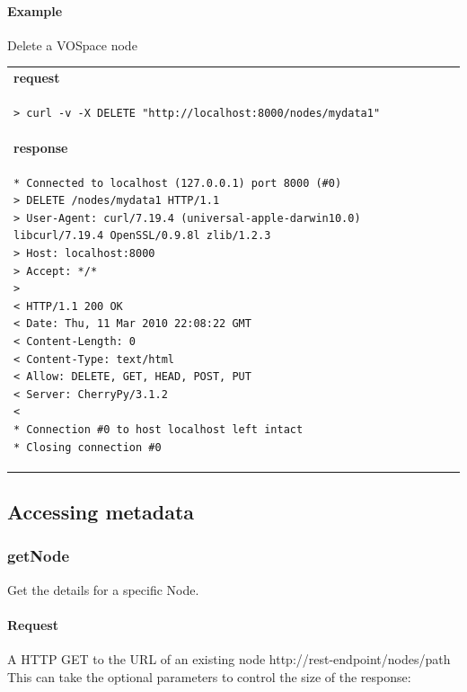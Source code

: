 \documentclass[11pt,a4paper]{ivoa}
\begin{document}
\paragraph{Example}
Delete a VOSpace node

\begin{tabular}{ p{10cm} }
\\
\textbf{request} \\
\begin{lstlisting}
> curl -v -X DELETE "http://localhost:8000/nodes/mydata1"
\end{lstlisting} \\
\textbf{response} \\
\begin{lstlisting}
* Connected to localhost (127.0.0.1) port 8000 (#0)
> DELETE /nodes/mydata1 HTTP/1.1
> User-Agent: curl/7.19.4 (universal-apple-darwin10.0) libcurl/7.19.4 OpenSSL/0.9.8l zlib/1.2.3
> Host: localhost:8000
> Accept: */*
> 
< HTTP/1.1 200 OK
< Date: Thu, 11 Mar 2010 22:08:22 GMT
< Content-Length: 0
< Content-Type: text/html
< Allow: DELETE, GET, HEAD, POST, PUT
< Server: CherryPy/3.1.2
< 
* Connection #0 to host localhost left intact
* Closing connection #0
\end{lstlisting}
\end{tabular}

\subsection{Accessing metadata}
\label{subsec:accessing metadata}

\subsubsection{getNode}
\label{subsubsec:getnode}
Get the details for a specific Node.

\paragraph{Request}
A HTTP GET to the URL of an existing node http://rest-endpoint/nodes/path
This can take the optional parameters to control the size of the response:
\end{document}
